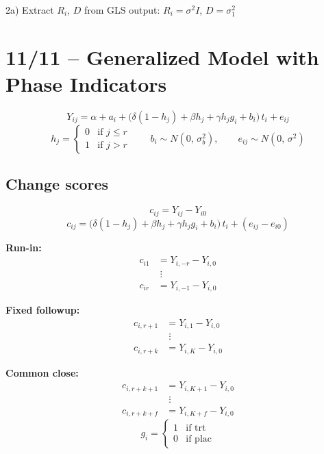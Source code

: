 \documentclass[11pt]{article}
\begin{document}
2a) Extract $R_i$, $D$ from GLS output: \quad
$R_i = \sigma^2 I$, \quad $D = \sigma_1^2$


\newpage
\section{11/11 -- Generalized Model with Phase Indicators}

\begin{equation}
  Y_{ij} = \alpha + a_i
    + \bigl(\delta(1-h_j) + \beta h_j
      + \gamma h_j g_i + b_i\bigr)\,t_i + e_{ij}
\end{equation}
\[
  h_j =
  \begin{cases}
    0 & \text{if } j \le r \\
    1 & \text{if } j > r
  \end{cases}
  \qquad
  b_i \sim N(0,\,\sigma_b^2), \qquad
  e_{ij} \sim N(0,\,\sigma^2)
\]

\subsection*{Change scores}

\[
  c_{ij} = Y_{ij} - Y_{i0}
\]
\begin{equation}
  c_{ij} = \bigl(\delta(1-h_j) + \beta h_j
    + \gamma h_j g_i + b_i\bigr)\,t_i
    + (e_{ij} - e_{i0})
\end{equation}

\medskip
\noindent\textbf{Run-in:}
\begin{align*}
  c_{i1} &= Y_{i,-r} - Y_{i,0} \\
  &\;\vdots \\
  c_{ir} &= Y_{i,-1} - Y_{i,0}
\end{align*}

\noindent\textbf{Fixed followup:}
\begin{align*}
  c_{i,r+1} &= Y_{i,1} - Y_{i,0} \\
  &\;\vdots \\
  c_{i,r+k} &= Y_{i,K} - Y_{i,0}
\end{align*}

\noindent\textbf{Common close:}
\begin{align*}
  c_{i,r+k+1} &= Y_{i,K+1} - Y_{i,0} \\
  &\;\vdots \\
  c_{i,r+k+f} &= Y_{i,K+f} - Y_{i,0}
\end{align*}
\[
  g_i =
  \begin{cases}
    1 & \text{if trt} \\
    0 & \text{if plac}
  \end{cases}
\]
\end{document}
